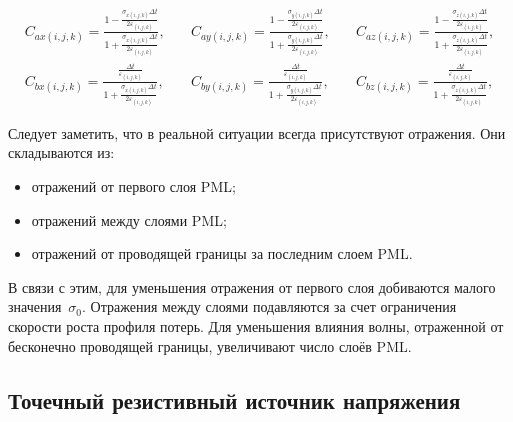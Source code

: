 \begin{equation*}
\begin{aligned}
C_{ax (i,j,k)} =
\frac
{
    1-\frac{\sigma_{x (i,j,k)}\Delta t}{2\varepsilon_{(i,j,k)}}
}{
    1+\frac{\sigma_{x (i,j,k)}\Delta t}{2\varepsilon_{(i,j,k)}}
}, \\
C_{bx (i,j,k)} =
\frac
{
    \frac{\Delta t}{\varepsilon_{(i,j,k)}}
}{
    1+\frac{\sigma_{x (i,j,k)}\Delta t}{2\varepsilon_{(i,j,k)}}
},
\end{aligned}
\quad
\begin{aligned}
C_{ay (i,j,k)} =
\frac
{
    1-\frac{\sigma_{y (i,j,k)}\Delta t}{2\varepsilon_{(i,j,k)}}
}{
    1+\frac{\sigma_{y (i,j,k)}\Delta t}{2\varepsilon_{(i,j,k)}}
}, \\
C_{by (i,j,k)} =
\frac
{
    \frac{\Delta t}{\varepsilon_{(i,j,k)}}
}{
    1+\frac{\sigma_{y (i,j,k)}\Delta t}{2\varepsilon_{(i,j,k)}}
},
\end{aligned}
\quad
\begin{aligned}
C_{az (i,j,k)} =
\frac
{
    1-\frac{\sigma_{z (i,j,k)}\Delta t}{2\varepsilon_{(i,j,k)}}
}{
    1+\frac{\sigma_{z (i,j,k)}\Delta t}{2\varepsilon_{(i,j,k)}}
}, \\
C_{bz (i,j,k)} =
\frac
{
    \frac{\Delta t}{\varepsilon_{(i,j,k)}}
}{
    1+\frac{\sigma_{z (i,j,k)}\Delta t}{2\varepsilon_{(i,j,k)}}
},
\end{aligned}
\end{equation*}


Следует заметить, что в реальной ситуации всегда присутствуют
отражения.
Они складываются из:
\begin{itemize}
  \item отражений от первого слоя PML;
  \item отражений между слоями PML;
  \item отражений от проводящей границы за последним слоем PML.
\end{itemize}

\noindent
В связи с этим, для уменьшения отражения от первого слоя добиваются малого значения~$\sigma_0$. Отражения между слоями подавляются за счет
ограничения скорости роста профиля потерь. Для уменьшения влияния волны,
отраженной от бесконечно проводящей границы, увеличивают число слоёв PML.

\subsection{Точечный резистивный источник напряжения}

